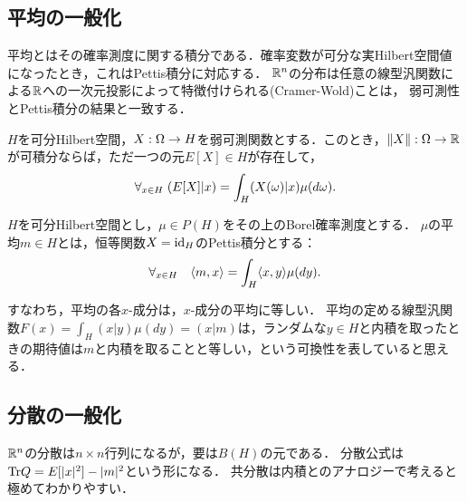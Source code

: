 \documentclass[uplatex,dvipdfmx]{jsreport}
\begin{document}
\subsection{平均の一般化}

\begin{tcolorbox}[colframe=ForestGreen, colback=ForestGreen!10!white,breakable,colbacktitle=ForestGreen!40!white,coltitle=black,fonttitle=\bfseries\sffamily,
title=]
    平均とはその確率測度に関する積分である．確率変数が可分な実Hilbert空間値になったとき，これはPettis積分に対応する．
    $\mathbb{R}^n$の分布は任意の線型汎関数による$\mathbb{R}$への一次元投影によって特徴付けられる(Cramer-Wold)ことは，
    弱可測性とPettis積分の結果と一致する．
\end{tcolorbox}

\begin{proposition}
    $H$を可分Hilbert空間，$X:\Omega\to H$を弱可測関数とする．このとき，$\|X\|:\Omega\to\mathbb{R}$が可積分ならば，ただ一つの元$E[X]\in H$が存在して，
    \[\forall_{x\in H}\;(E[X]|x)=\int_H (X(\omega)|x)\mu(d\omega).\]
\end{proposition}


\begin{definition}[平均]
    $H$を可分Hilbert空間とし，$\mu\in P(H)$をその上のBorel確率測度とする．
    $\mu$の平均$m\in H$とは，恒等関数$X=\mathrm{id}_H$のPettis積分とする：
    \[\forall_{x\in H}\quad\langle m,x\rangle=\int_H\langle x,y\rangle\mu(dy).\]
\end{definition}
\begin{remarks}
    すなわち，平均の各$x$-成分は，$x$-成分の平均に等しい．
    平均の定める線型汎関数$F(x)=\int_H(x|y)\mu(dy)=(x|m)$は，ランダムな$y\in H$と内積を取ったときの期待値は$m$と内積を取ることと等しい，という可換性を表していると思える．
\end{remarks}

\subsection{分散の一般化}

\begin{tcolorbox}[colframe=ForestGreen, colback=ForestGreen!10!white,breakable,colbacktitle=ForestGreen!40!white,coltitle=black,fonttitle=\bfseries\sffamily,
title=]
    $\mathbb{R}^n$の分散は$n\times n$行列になるが，要は$B(H)$の元である．
    分散公式は$\mathrm{Tr} Q=E[\lvert x\rvert^2]-\lvert m\rvert^2$という形になる．
    共分散は内積とのアナロジーで考えると極めてわかりやすい．
\end{tcolorbox}
\end{document}
